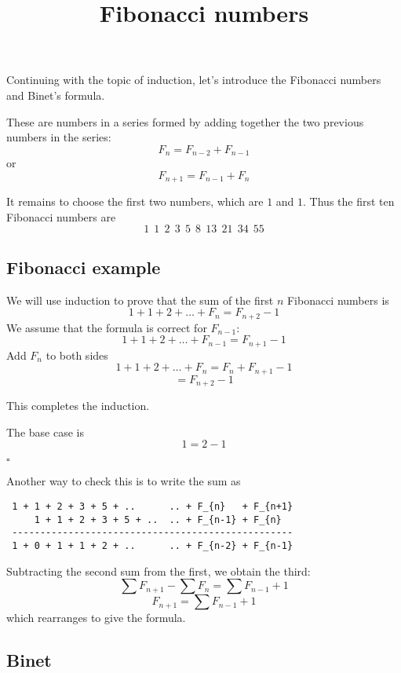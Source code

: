 \documentclass[11pt, oneside]{article}
\title{Fibonacci numbers}
\date{}
\begin{document}
\maketitle
\Large


\label{sec:fibonacci}

Continuing with the topic of induction, let's introduce the Fibonacci numbers and Binet's formula.  

These are numbers in a series formed by adding together the two previous numbers in the series:
\[ F_n = F_{n-2} + F_{n-1} \]
or
\[ F_{n+1} = F_{n-1} + F_{n} \]

It remains to choose the first two numbers, which are $1$ and $1$.  Thus the first ten Fibonacci numbers are
\[ 1 \ \  1 \ \   2 \ \   3  \ \  5  \ \  8 \ \   13 \ \   21 \ \   34 \ \   55 \]

\subsection*{Fibonacci example}

We will use induction to prove that the sum of the first $n$ Fibonacci numbers is
\[ 1 + 1 + 2 + \dots + F_n = F_{n+2} - 1 \]
We assume that the formula is correct for $F_{n - 1}$:
\[ 1 + 1 + 2 + \dots + F_{n-1} = F_{n+1} - 1 \]
Add $F_{n}$ to both sides
\[ 1 + 1 + 2 + \dots + F_{n} = F_{n} + F_{n+1} - 1 \]
\[ = F_{n+2} - 1 \]

This completes the induction.

The base case is 
\[ 1 = 2 - 1 \]

$\square$

Another way to check this is to write the sum as

\begin{verbatim}
 1 + 1 + 2 + 3 + 5 + ..      .. + F_{n}   + F_{n+1}
     1 + 1 + 2 + 3 + 5 + ..  .. + F_{n-1} + F_{n}
 --------------------------------------------------
 1 + 0 + 1 + 1 + 2 + ..      .. + F_{n-2} + F_{n-1}
\end{verbatim}

Subtracting the second sum from the first, we obtain the third:
\[ \sum F_{n+1} - \sum F_n =  \sum F_{n-1} + 1  \]
\[ F_{n+1}  =  \sum F_{n-1} + 1  \]
which rearranges to give the formula.

\subsection*{Binet}
\end{document}
